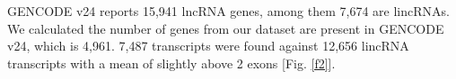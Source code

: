 \documentclass[ncrna,article,submit,moreauthors,pdftex,10pt,a4paper]{mdpi}
\begin{document}
GENCODE v24 reports 15,941 lncRNA genes, among them 7,674 are lincRNAs. We calculated the number of genes from our dataset are present in GENCODE v24, which is 4,961. 7,487 transcripts were found against 12,656 lincRNA transcripts with a mean of slightly above 2 exons [Fig. \ref{f2}].

\clearpage


\end{document}
